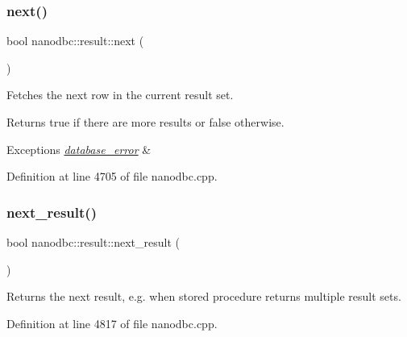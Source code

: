 \mbox{\label{classnanodbc_1_1result_a31470b51f194181373e4c2c4292d11c4}} 
\subsubsection{\texorpdfstring{next()}{next()}}
{\footnotesize\ttfamily bool nanodbc\+::result\+::next (\begin{DoxyParamCaption}{ }\end{DoxyParamCaption})}



Fetches the next row in the current result set. 

\begin{DoxyReturn}{Returns}
true if there are more results or false otherwise. 
\end{DoxyReturn}

\begin{DoxyExceptions}{Exceptions}
{\em \mbox{\hyperlink{classnanodbc_1_1database__error}{database\+\_\+error}}} & \\
\hline
\end{DoxyExceptions}


Definition at line 4705 of file nanodbc.\+cpp.

\mbox{\label{classnanodbc_1_1result_a9cb9d5325c3ce58e7c48c1e4da1a99bb}} 
\subsubsection{\texorpdfstring{next\_result()}{next\_result()}}
{\footnotesize\ttfamily bool nanodbc\+::result\+::next\+\_\+result (\begin{DoxyParamCaption}{ }\end{DoxyParamCaption})}



Returns the next result, e.\+g. when stored procedure returns multiple result sets. 



Definition at line 4817 of file nanodbc.\+cpp.

\mbox{\label{classnanodbc_1_1result_a235653804363793ffe2e8300160694f6}} 
